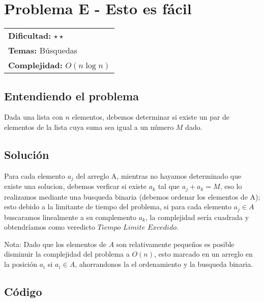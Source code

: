 \section{Problema E - Esto es fácil}

\hfill
\begin{tabular}{@{}l@{}}
\textbf{Dificultad:} $\star\star$ \\
\textbf{Temas:} Búsquedas \\
\textbf{Complejidad:} $O(n \log n)$
\end{tabular}

\subsection*{Entendiendo el problema}
Dada una lista con $n$ elementos, debemos determinar si existe un par de elementos de la lista cuya suma sea igual a un número $M$ dado.
\subsection*{Solución}
Para cada elemento $a_j$ del arreglo A, mientras no hayamos determinado que existe una solucion, debemos verficar si existe $a_k$ tal que $a_j + a_k =M$, eso lo realizamos mediante una busqueda binaria (debemos ordenar los elementos de A); esto debido a la limitante de tiempo del problema, si para cada elemento $a_j \in A$ buscaramos linealmente a su complemento $a_k$, la complejidad sería cuadrada y obtendríamos como veredicto $Tiempo$ $Limite$ $Excedido$.

Nota: Dado que los elementos de $A$ son relativamente pequeños es posible disminuir la complejidad del problema a $O(n)$, esto marcado en un arreglo en la posición $a_i$ si $a_i \in A$, ahorrandonos la el ordenamiento y la busqueda binaria.
\subsection*{Código}

